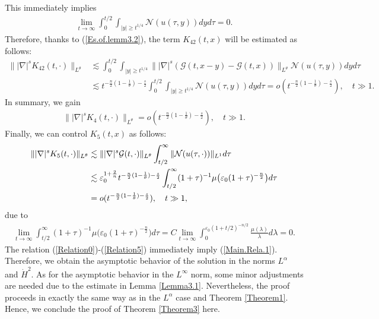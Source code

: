 \documentclass[11pt,reqno]{amsart}
\begin{document}
This immediately implies
\begin{align*}
    \lim_{t \to \infty}\int_0^{t/2}\int_{|y| \geq t^{1/4}}   \mathcal{N}(u(\tau,y)) dyd\tau = 0.
\end{align*}
Therefore, thanks to (\ref{Es.of.lemm3.2}), the term $K_{42}(t,x)$ will be estimated as follows:
\begin{align*}
    \||\nabla|^s K_{42}(t,\cdot)\|_{L^\theta} &\lesssim \int_0^{t/2} \int_{|y| \geq t^{1/4}} \||\nabla|^s(\mathcal{G}(t, x-y)-\mathcal{G}(t,x))\|_{L^\theta
    } \mathcal{N}(u(\tau,y)) dyd\tau\\
    &\lesssim t^{-\frac{n}{2}(1-\frac{1}{\theta})-\frac{s}{2}} \int_0^{t/2}\int_{|y| \geq t^{1/4}}  \mathcal{N}(u(\tau,y)) dyd\tau = o(t^{-\frac{n}{2}(1-\frac{1}{\theta})-\frac{s}{2}}), \quad t \gg 1.
\end{align*}
In summary, we gain
\begin{align}
    \||\nabla|^s K_4(t,\cdot)\|_{L^\theta} = o(t^{-\frac{n}{2}(1-\frac{1}{\theta})-\frac{s}{2}}), \quad t \gg 1. \label{Relation4}
\end{align}
Finally, we can control $K_5(t,x)$ as follows:
\begin{align}
    \||\nabla|^s K_5(t,\cdot)\|_{L^\theta} &\lesssim \||\nabla|^s\mathcal{G}(t,\cdot)\|_{L^\theta} \int_{t/2}^\infty \|\mathcal{N}(u(\tau,\cdot))\|_{L^1} d\tau\notag\\
    &\lesssim \varepsilon_0^{1+\frac{2}{n}} t^{-\frac{n}{2}(1-\frac{1}{\theta})-\frac{s}{2}} \int_{t/2}^{\infty} (1+\tau)^{-1} \mu\big(\varepsilon_0 (1+\tau)^{-\frac{n}{2}}\big) d\tau\notag\\
    &= o(t^{-\frac{n}{2}(1-\frac{1}{\theta})-\frac{s}{2}}), \quad t \gg 1, \label{Relation5}
\end{align}
due to
\begin{align*}
    \lim_{t \to \infty} \int_{t/2}^{\infty} (1+\tau)^{-1} \mu\big(\varepsilon_0 (1+\tau)^{-\frac{n}{2}}\big) d\tau = C \lim_{t \to \infty} \int_0^{\varepsilon_0(1+t/2)^{-n/2}} \frac{\mu(\lambda)}{\lambda} d\lambda = 0.
\end{align*}
The relation (\ref{Relation0})-(\ref{Relation5}) immediately imply (\ref{Main.Rela.1}). Therefore, we obtain the asymptotic behavior of the solution in the norms $L^\alpha$ and $\dot{H}^2$. As for the asymptotic behavior in the $L^\infty$ norm, some minor adjustments are needed due to the estimate in Lemma \ref{Lemma3.1}. Nevertheless, the proof proceeds in exactly the same way as in the $L^\alpha$ case and Theorem \ref{Theorem1}. Hence, we conclude the proof of Theorem \ref{Theorem3} here.
\end{document}
